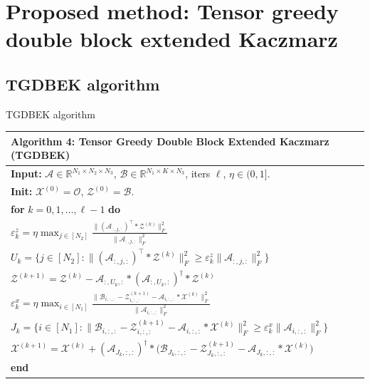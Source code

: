 \documentclass[aspectratio=169]{beamer}
\begin{document}
\section{Proposed method: Tensor greedy double  block extended Kaczmarz}
\subsection{TGDBEK algorithm}
\begin{frame}[t]{TGDBEK algorithm}
\scriptsize
\setlength{\tabcolsep}{2pt}
\renewcommand{\arraystretch}{1.05}

\begin{center}
\begin{tabular*}{\linewidth}{@{\extracolsep{\fill}}l@{}}
\toprule
{\bf Algorithm 4:} Tensor Greedy Double Block Extended Kaczmarz (TGDBEK)\\
\midrule
{\bf Input:} $\mathcal{A}\!\in\!\mathbb{R}^{N_1\times N_2\times N_3}$, $\mathcal{B}\!\in\!\mathbb{R}^{N_1\times K\times N_3}$, iters $\ell$, $\eta\in(0,1]$.\\
{\bf Init:} $\mathcal{X}^{(0)}=\mathcal{O}$, $\mathcal{Z}^{(0)}=\mathcal{B}$.\\
{\bf for} $k=0,1,\ldots,\ell-1$ {\bf do}\\
\quad $\displaystyle \varepsilon_k^{z}=\eta\max_{j\in[N_2]}
\frac{\|(\mathcal{A}_{:,j,:})^\top * \mathcal{Z}^{(k)}\|_{F}^2}{\|\mathcal{A}_{:,j,:}\|_{F}^2}$\\[-0.2em]
\quad $\displaystyle U_k=\Big\{j\in[N_2]:\|(\mathcal{A}_{:,j,:})^\top * \mathcal{Z}^{(k)}\|_{F}^2\ge
\varepsilon_k^{z}\|\mathcal{A}_{:,j,:}\|_{F}^2\Big\}$\\[-0.2em]
\quad $\displaystyle \mathcal{Z}^{(k+1)}=\mathcal{Z}^{(k)}-\mathcal{A}_{:,U_k,:}*(\mathcal{A}_{:,U_k,:})^\dagger*\mathcal{Z}^{(k)}$\\[-0.1em]
\quad $\displaystyle \varepsilon_k^{x}=\eta\max_{i\in[N_1]}
\frac{\|\mathcal{B}_{i,:,:}-\mathcal{Z}^{(k+1)}_{i,:,:}-\mathcal{A}_{i,:,:}*\mathcal{X}^{(k)}\|_{F}^2}{\|\mathcal{A}_{i,:,:}\|_{F}^2}$\\[-0.2em]
\quad $\displaystyle J_k=\Big\{i\in[N_1]:\|\mathcal{B}_{i,:,:}-\mathcal{Z}^{(k+1)}_{i,:,:}-\mathcal{A}_{i,:,:}*\mathcal{X}^{(k)}\|_{F}^2\ge
\varepsilon_k^{x}\|\mathcal{A}_{i,:,:}\|_{F}^2\Big\}$\\[-0.2em]
\quad $\displaystyle \mathcal{X}^{(k+1)}=\mathcal{X}^{(k)}+(\mathcal{A}_{J_k,:,:})^\dagger*
\Big(\mathcal{B}_{J_k,:,:}-\mathcal{Z}^{(k+1)}_{J_k,:,:}-\mathcal{A}_{J_k,:,:}*\mathcal{X}^{(k)}\Big)$\\
{\bf end}\\
\bottomrule
\end{tabular*}
\end{center}
\end{frame}
\end{document}
